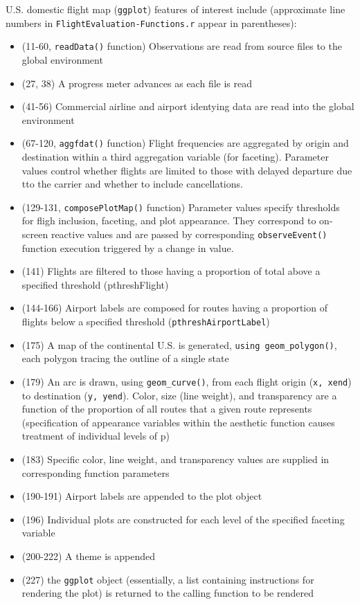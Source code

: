 \documentclass[10pt, letterpaper]{article}
\begin{document}
\begin{spacing}{1.0}
U.S. domestic flight map (\texttt{ggplot}) features of interest include (approximate line numbers in \texttt{FlightEvaluation-Functions.r} appear in parentheses):

\begin{itemize}
  \item (11-60, \texttt{readData()} function) Observations are read from source files to the global environment
    \item (27, 38) A progress meter advances as each file is read
    \item (41-56) Commercial airline and airport identying data are read into the global environment
    \item (67-120, \texttt{aggfdat()} function) Flight frequencies are aggregated by origin and destination within a third aggregation variable (for faceting).  Parameter values control whether flights are limited to those with delayed departure due tto the carrier and whether to include cancellations. 
    \item (129-131, \texttt{composePlotMap()} function) Parameter values specify thresholds for fligh inclusion, faceting, and plot appearance.  They correspond to on-screen reactive values and are passed by corresponding \texttt{observeEvent()} function execution triggered by a change in value.
    \item (141) Flights are filtered to those having a proportion of total above a specified threshold (pthreshFlight)
    \item (144-166) Airport labels are composed for routes having a proportion of flights below a specified threshold (\texttt{pthreshAirportLabel})
    \item (175) A map of the continental U.S. is generated, \texttt{using geom\_polygon()}, each polygon tracing the outline of a single state
    \item (179) An arc is drawn, using \texttt{geom\_curve()}, from each flight origin (\texttt{x, xend}) to destination (\texttt{y, yend}).  Color, size (line weight), and transparency are a function of the proportion of all routes that a given route represents (specification of appearance variables within the aesthetic function causes treatment of individual levels of p)
    \item (183) Specific color, line weight, and transparency values are supplied in corresponding function parameters
    \item (190-191) Airport labels are appended to the plot object
    \item (196) Individual plots are constructed for each level of the specified faceting variable
    \item (200-222) A theme is appended
    \item (227) the \texttt{ggplot} object (essentially, a list containing instructions for rendering the plot) is returned to the calling function to be rendered
\end{itemize}


\end{spacing}
\end{document}
